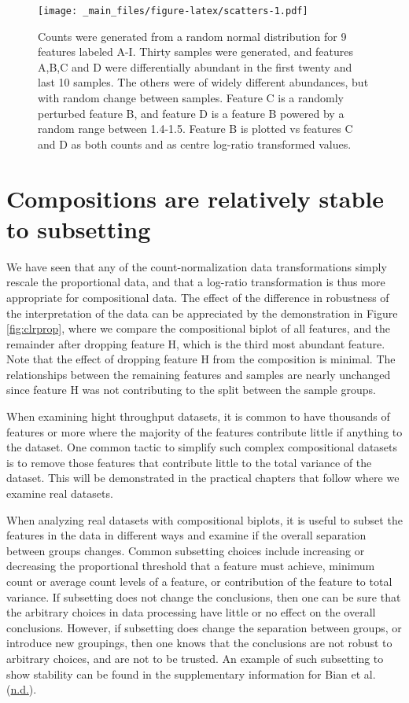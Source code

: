 \documentclass[onecolumn]{book}
\theoremstyle{definition}
\theoremstyle{definition}
\theoremstyle{definition}
\theoremstyle{remark}
\begin{document}
\begin{figure}
\centering
\texttt{[image: \_main\_files/figure-latex/scatters-1.pdf]}
\caption{\label{fig:scatters}Counts were generated from a random normal
distribution for 9 features labeled A-I. Thirty samples were generated,
and features A,B,C and D were differentially abundant in the first
twenty and last 10 samples. The others were of widely different
abundances, but with random change between samples. Feature C is a
randomly perturbed feature B, and feature D is a feature B powered by a
random range between 1.4-1.5. Feature B is plotted vs features C and D
as both counts and as centre log-ratio transformed values.}
\end{figure}

\hypertarget{compositions-are-relatively-stable-to-subsetting}{%
\section{Compositions are relatively stable to
subsetting}\label{compositions-are-relatively-stable-to-subsetting}}

We have seen that any of the count-normalization data transformations
simply rescale the proportional data, and that a log-ratio
transformation is thus more appropriate for compositional data. The
effect of the difference in robustness of the interpretation of the data
can be appreciated by the demonstration in Figure \ref{fig:clrprop},
where we compare the compositional biplot of all features, and the
remainder after dropping feature H, which is the third most abundant
feature. Note that the effect of dropping feature H from the composition
is minimal. The relationships between the remaining features and samples
are nearly unchanged since feature H was not contributing to the split
between the sample groups.

When examining hight throughput datasets, it is common to have thousands
of features or more where the majority of the features contribute little
if anything to the dataset. One common tactic to simplify such complex
compositional datasets is to remove those features that contribute
little to the total variance of the dataset. This will be demonstrated
in the practical chapters that follow where we examine real datasets.

When analyzing real datasets with compositional biplots, it is useful to
subset the features in the data in different ways and examine if the
overall separation between groups changes. Common subsetting choices
include increasing or decreasing the proportional threshold that a
feature must achieve, minimum count or average count levels of a
feature, or contribution of the feature to total variance. If subsetting
does not change the conclusions, then one can be sure that the arbitrary
choices in data processing have little or no effect on the overall
conclusions. However, if subsetting does change the separation between
groups, or introduce new groupings, then one knows that the conclusions
are not robust to arbitrary choices, and are not to be trusted. An
example of such subsetting to show stability can be found in the
supplementary information for Bian et al.
(\protect\hyperlink{ref-bian:2017}{n.d.}).
\end{document}
